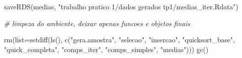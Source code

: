 \documentclass[
]{article}
\newenvironment{Shaded}{\begin{snugshade}}{\end{snugshade}}
\newcommand{\AttributeTok}[1]{\textcolor[rgb]{0.77,0.63,0.00}{#1}}
\newcommand{\CommentTok}[1]{\textcolor[rgb]{0.56,0.35,0.01}{\textit{#1}}}
\newcommand{\FunctionTok}[1]{\textcolor[rgb]{0.00,0.00,0.00}{#1}}
\newcommand{\NormalTok}[1]{#1}
\newcommand{\StringTok}[1]{\textcolor[rgb]{0.31,0.60,0.02}{#1}}
\begin{document}
\begin{Shaded}
\begin{Highlighting}[]
\FunctionTok{saveRDS}\NormalTok{(medias, }\StringTok{"trabalho pratico 1/dados gerados tp1/medias\_iter.Rdata"}\NormalTok{)}

\CommentTok{\# limpeza do ambiente, deixar apenas funcoes e objetos finais}

\FunctionTok{rm}\NormalTok{(}\AttributeTok{list=}\FunctionTok{setdiff}\NormalTok{(}\FunctionTok{ls}\NormalTok{(), }\FunctionTok{c}\NormalTok{(}\StringTok{"gera.amostra"}\NormalTok{, }\StringTok{"selecao"}\NormalTok{, }\StringTok{"insercao"}\NormalTok{, }
                        \StringTok{"quicksort\_base"}\NormalTok{, }\StringTok{"quick\_completa"}\NormalTok{,}
                        \StringTok{"comps\_iter"}\NormalTok{, }\StringTok{"comps\_simples"}\NormalTok{, }\StringTok{"medias"}\NormalTok{)))}
\FunctionTok{gc}\NormalTok{()}
\end{Highlighting}
\end{Shaded}
\end{document}
